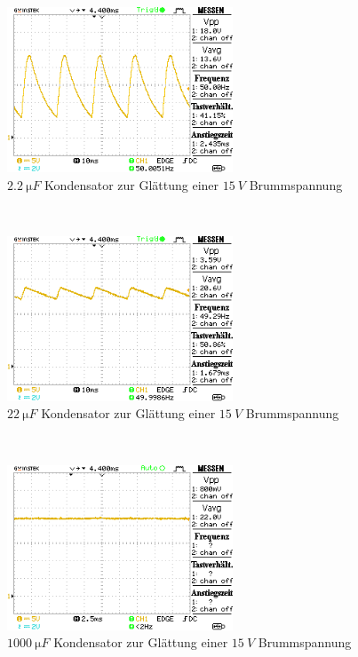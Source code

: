 \documentclass[a4paper,10pt]{article}
\numberwithin{equation}{section}
\begin{document}
\begin{figure}[h]
        \centering
        \includegraphics[width=0.6\textwidth]{data/a3_b.BMP.png}
        \caption{$\SI{2.2}{\micro F}$ Kondensator zur Glättung einer $\SI{15}{V}$ Brummspannung}
\end{figure}\\
\begin{figure}[h]
        \centering
        \includegraphics[width=0.6\textwidth]{data/a3_c.BMP.png}
        \caption{$\SI{22}{\micro F}$ Kondensator zur Glättung einer $\SI{15}{V}$ Brummspannung}
\end{figure}\\
\begin{figure}[h]
        \centering
        \includegraphics[width=0.6\textwidth]{data/a3_d.BMP.png}
        \caption{$\SI{1000}{\micro F}$ Kondensator zur Glättung einer $\SI{15}{V}$ Brummspannung}
\end{figure}\\
\end{document}

